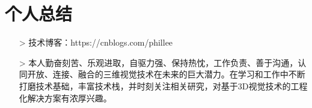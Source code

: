 \documentclass{resume}
\begin{document}
\section{个人总结}
\begin{itemize}
  \item [>] 技术博客：https://cnblogs.com/phillee
  \item [>] 本人勤奋刻苦、乐观进取，自驱力强、保持热忱，工作负责、善于沟通，认同开放、连接、融合的三维视觉技术在未来的巨大潜力。在学习和工作中不断打磨技术基础，丰富技术栈，并时刻关注相关研究，对基于3D视觉技术的工程化解决方案有浓厚兴趣。
\end{itemize}

%
%
\end{document}
